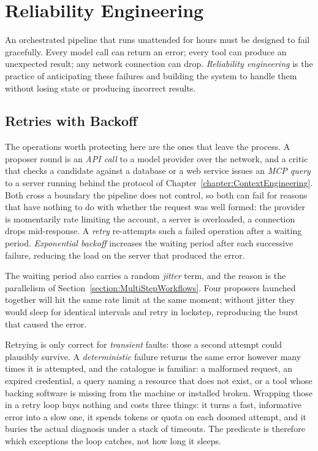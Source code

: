 \section{Reliability Engineering}
\label{section:Reliability}

An orchestrated pipeline that runs unattended for hours must be designed to fail gracefully.
Every model call can return an error; every tool can produce an unexpected result; any network connection can drop.
\emph{Reliability engineering} is the practice of anticipating these failures and building the system to handle them without losing state or producing incorrect results.

\subsection{Retries with Backoff}

The operations worth protecting here are the ones that leave the process.
A proposer round is an \emph{API call} to a model provider over the network, and a critic that checks a candidate against a database or a web service issues an \emph{MCP query} to a server running behind the protocol of Chapter~\ref{chapter:ContextEngineering}.
Both cross a boundary the pipeline does not control, so both can fail for reasons that have nothing to do with whether the request was well formed: the provider is momentarily rate limiting the account, a server is overloaded, a connection drops mid-response.
A \emph{retry} re-attempts such a failed operation after a waiting period.
\emph{Exponential backoff} increases the waiting period after each successive failure, reducing the load on the server that produced the error.

The waiting period also carries a random \emph{jitter} term, and the reason is the parallelism of Section~\ref{section:MultiStepWorkflows}.
Four proposers launched together will hit the same rate limit at the same moment; without jitter they would sleep for identical intervals and retry in lockstep, reproducing the burst that caused the error.

Retrying is only correct for \emph{transient} faults: those a second attempt could plausibly survive.
A \emph{deterministic} failure returns the same error however many times it is attempted, and the catalogue is familiar: a malformed request, an expired credential, a query naming a resource that does not exist, or a tool whose backing software is missing from the machine or installed broken.
Wrapping those in a retry loop buys nothing and costs three things: it turns a fast, informative error into a slow one, it spends tokens or quota on each doomed attempt, and it buries the actual diagnosis under a stack of timeouts.
The predicate is therefore which exceptions the loop catches, not how long it sleeps.

